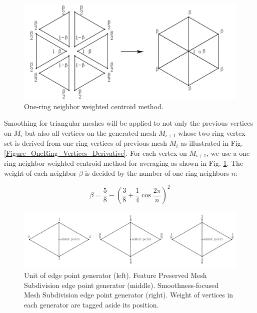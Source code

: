 \documentclass[10pt, conference, compsocconf]{IEEEtran}
\begin{document}
\begin{figure}[htbp]
  \centering
  \includegraphics[width=0.9\linewidth]{./Figure/WeightedCentroid.png}
  \caption{One-ring neighbor weighted centroid method.}\label{Figure_Weighted_Centroid}
\end{figure}

Smoothing for triangular meshes will be applied to not only the previous vertices on $M_i$ but also all vertices on the generated mesh $M_{i+1}$ whose two-ring vertex set is derived from one-ring vertices of previous mesh $M_i$ as illustrated in Fig. \ref{Figure_OneRing_Vertices_Derivative}. For each vertex on $M_{i+1}$, we use a one-ring neighbor weighted centroid method for averaging as shown in Fig. \ref{Figure_Weighted_Centroid}. The weight of each neighbor $\beta$ is decided by the number of one-ring neighbors $n$:

\begin{equation}\label{Equation_beta}
  \beta=\frac{5}{8}-(\frac{3}{8}+\frac{1}{4}\cos\frac{2\pi}{n})^2
\end{equation}


\begin{figure}[htbp]
  \centering
  \includegraphics[width=0.9\linewidth]{./Figure/EdgePointGenerator.png}
  \caption{Unit of edge point generator (left). Feature Preserved Mesh Subdivision edge point generator (middle). Smoothness-focused Mesh Subdivision edge point generator (right). Weight of vertices in each generator are tagged aside its position.}\label{Figure_Edge_Point_Generator}
\end{figure}
\end{document}
